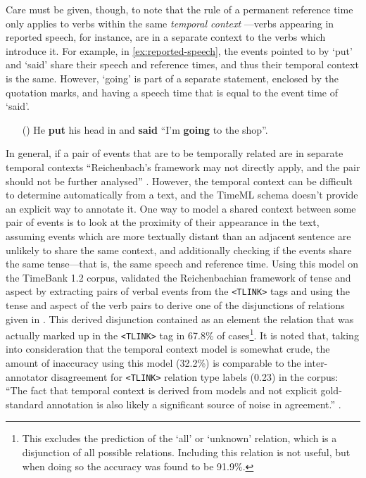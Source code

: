 \documentclass[a4paper,12pt,leqno,twoside]{article}
\newcommand{\ipp}{(\refstepcounter{equation}\theequation)}
\begin{document}
Care must be given, though, to note that the rule of a permanent reference time only applies to verbs within the same \textit{temporal context} \citep{hornstein1990time,Derczynski2013}---verbs appearing in reported speech, for instance, are in a separate context to the verbs which introduce it. For example, in \cref{ex:reported-speech}, the events pointed to by `put' and `said' share their speech and reference times, and thus their temporal context is the same. However, `going' is part of a separate statement, enclosed by the quotation marks, and having a speech time that is equal to the event time of `said'.

\begin{itemize}
	\item[\ipp\label{ex:reported-speech}] He \textbf{put} his head in and \textbf{said} ``I'm \textbf{going} to the shop''.
\end{itemize}
In general, if a pair of events that are to be temporally related are in separate temporal contexts ``Reichenbach's framework may not directly apply, and the pair should not be further analysed'' \citep[p. 75]{Derczynski2013}. However, the temporal context can be difficult to determine automatically from a text, and the TimeML schema doesn't provide an explicit way to annotate it. One way to model a shared context between some pair of events is to look at the proximity of their appearance in the text, assuming events which are more textually distant than an adjacent sentence are unlikely to share the same context, and additionally checking if the events share the same tense---that is, the same speech and reference time. Using this model on the TimeBank 1.2 \citep{pustejovsky2006timebank} corpus, \citet[p. 80]{Derczynski2013} validated the Reichenbachian framework of tense and aspect by extracting pairs of verbal events from the \verb|<TLINK>| tags and using the tense and aspect of the verb pairs to derive one of the disjunctions of relations given in . This derived disjunction contained as an element the relation that was actually marked up in the \verb|<TLINK>| tag in 67.8\% of cases\footnote{This excludes the prediction of the `all' or `unknown' relation, which is a disjunction of all possible relations. Including this relation is not useful, but when doing so the accuracy was found to be 91.9\%.}. It is noted that, taking into consideration that the temporal context model is somewhat crude, the amount of inaccuracy using this model (32.2\%) is comparable to the inter-annotator disagreement for \verb|<TLINK>| relation type labels (0.23) in the corpus: ``The fact that temporal context is derived from models and not explicit gold-standard annotation is also likely a significant source of noise in agreement.'' \citep[p. 80]{Derczynski2013}.
\end{document}
